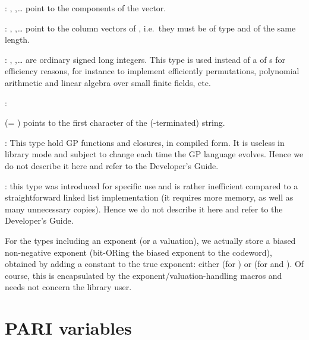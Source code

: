 :%
, ,\dots {} point to the components of the
vector.

: ,
,\dots {} point to the column vectors of ,
i.e.~they must be of type  and of the same length.

:
, ,\dots {} are ordinary signed long
integers. This type is used instead of a  of s for
efficiency reasons, for instance to implement efficiently permutations,
polynomial arithmetic and linear algebra over small finite fields, etc.

:%

 (= ) points to the first character of the
(-terminated) string.

:
This type hold GP functions and closures, in compiled form. It is useless in
library mode and subject to change each time the GP language evolves. Hence we
do not describe it here and refer to the Developer's Guide.

:
this type was introduced for specific  use and is rather inefficient
compared to a straightforward linked list implementation (it requires more
memory, as well as many unnecessary copies). Hence we do not describe it
here and refer to the Developer's Guide.

 For the types including an exponent (or a
valuation), we actually store a biased non-negative exponent (bit-ORing the
biased exponent to the codeword), obtained by adding a constant to the true
exponent: either  (for ) or  (for
 and ). Of course, this is encapsulated by the
exponent/valuation-handling macros and needs not concern the library user.

\section{PARI variables}\label{se:vars}

